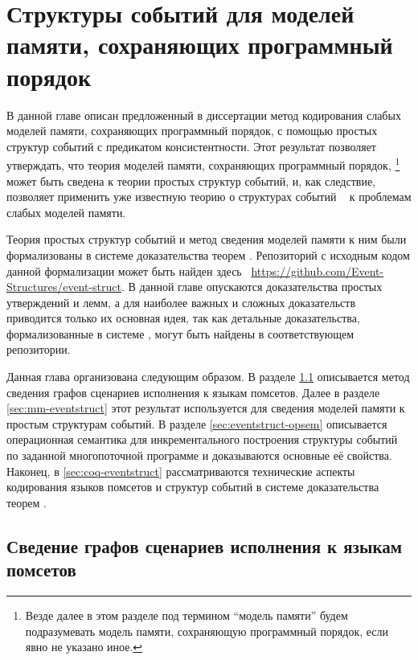 \chapter{Структуры событий для моделей памяти, сохраняющих программный порядок}
\label{ch:porf-evenstruct}

В данной главе описан предложенный в диссертации метод 
кодирования слабых моделей памяти, сохраняющих программный порядок, 
с помощью простых структур событий с предикатом консистентности. 
Этот результат позволяет утверждать, что теория  
моделей памяти, сохраняющих программный порядок,%
\footnote{Везде далее в этом разделе 
под термином ``модель памяти'' будем подразумевать 
модель памяти, сохраняющую программный порядок, если явно не указано иное.}
может быть сведена к теории простых структур событий, 
и, как следствие, позволяет применить уже известную теорию о структурах событий%
~\cite{Winskel:86,Vaandrager:TCS1991,Sassone:MFCS1993,Nielsen:REX93,Winskel-TCS:09}
к проблемам слабых моделей памяти.

Теория простых структур событий и метод сведения 
моделей памяти к ним были формализованы в системе 
доказательства теорем \coq.
Репозиторий с исходным кодом данной формализации
может быть найден здесь~%
\url{https://github.com/Event-Structures/event-struct}.
В данной главе опускаются доказательства
простых утверждений и лемм, а для наиболее
важных и сложных доказательств приводится только их основная идея,
так как детальные доказательства, формализованные в системе \coq,
могут быть найдены в соответствующем репозитории.


Данная глава организована следующим образом. 
В разделе \ref{sec:pomset-graphs} описывается метод 
сведения графов сценариев исполнения к языкам помсетов. 
Далее в разделе \ref{sec:mm-eventstruct} этот результат 
используется для сведения моделей памяти к простым структурам событий. 
В разделе \ref{sec:eventstruct-opsem} описывается 
операционная семантика для инкрементального построения 
структуры событий по заданной многопоточной программе 
и доказываются основные её свойства. 
Наконец, в \ref{sec:coq-eventstruct} рассматриваются 
технические аспекты кодирования языков помсетов и структур событий 
в системе доказательства теорем \coq.

\section{Сведение графов сценариев исполнения к языкам помсетов}
\label{sec:pomset-graphs}

